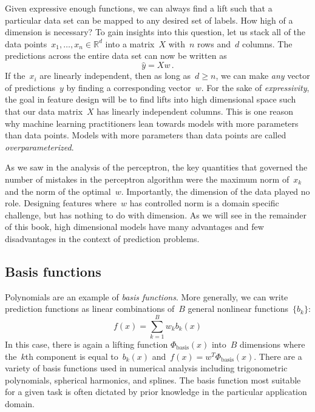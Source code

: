 \documentclass{tufte-book}
\begin{document}
Given expressive enough functions, we can always find a lift such that a
particular data set can be mapped to any desired set of labels. How high
of a dimension is necessary? To gain insights into this question, let us
stack all of the data points~\(x_1,\ldots,x_n \in\mathbb{R}^d\) into a
matrix~\(X\) with~\(n\) rows and~\(d\) columns. The predictions across
the entire data set can now be written as \[
 \hat{y} = Xw\,.
\] If the~\(x_i\) are linearly independent, then as long
as~\(d \geq n\), we can make \emph{any} vector of predictions~\(y\) by
finding a corresponding vector~\(w\). For the sake of
\emph{expressivity}, the goal in feature design will be to find lifts
into high dimensional space such that our data matrix~\(X\) has linearly
independent columns. This is one reason why machine learning
practitioners lean towards models with more parameters than data points.
Models with more parameters than data points are called
\emph{overparameterized}.


As we saw in the analysis of the perceptron, the key quantities that
governed the number of mistakes in the perceptron algorithm were the
maximum norm of~\(x_k\) and the norm of the optimal~\(w\). Importantly,
the dimension of the data played no role. Designing features where~\(w\)
has controlled norm is a domain specific challenge, but has nothing to
do with dimension. As we will see in the remainder of this book, high
dimensional models have many advantages and few disadvantages in the
context of prediction problems.

\hypertarget{basis-functions}{%
\subsection{Basis functions}\label{basis-functions}}


Polynomials are an example of \emph{basis functions}. More generally, we
can write prediction functions as linear combinations of~\(B\) general
nonlinear functions~\(\{b_k\}\): \[
    f(x) = \sum_{k=1}^{B} w_k b_k(x)
\] In this case, there is again a lifting function
\(\Phi_{\text{basis}}(x)\) into~\(B\) dimensions where the~\(k\)th
component is equal to~\(b_k(x)\)
and~\(f(x) =w^T \Phi_{\text{basis}}(x)\). There are a variety of basis
functions used in numerical analysis including trigonometric
polynomials, spherical harmonics, and splines. The basis function most
suitable for a given task is often dictated by prior knowledge in the
particular application domain.
\end{document}
